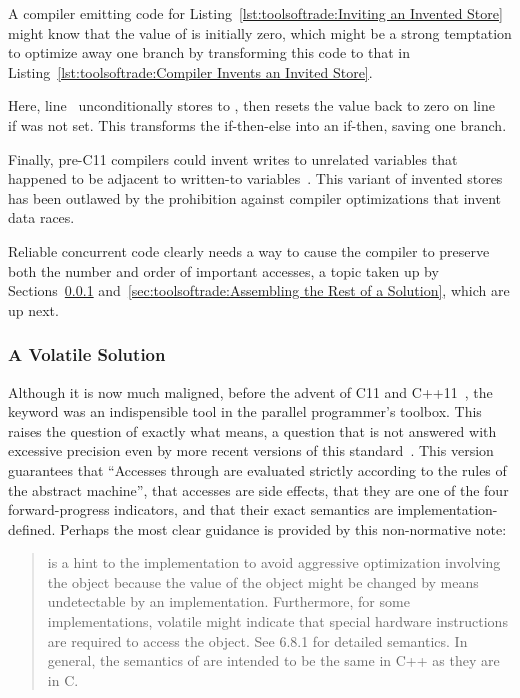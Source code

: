 A compiler emitting code for
Listing~\ref{lst:toolsoftrade:Inviting an Invented Store}
might know that the value of  is initially zero,
which might be a strong temptation to optimize away one branch
by transforming this code to that in
Listing~\ref{lst:toolsoftrade:Compiler Invents an Invited Store}.
\begin{lineref}
Here, line~ unconditionally stores  to , then
resets the value back to zero on
line~ if  was not set.
This transforms the if-then-else into an if-then, saving one branch.
\end{lineref}

Finally, pre-C11 compilers could invent writes to unrelated
variables that happened to be adjacent to written-to
variables~\cite[Section 4.2]{Boehm:2005:TCI:1064978.1065042}.
This variant of invented stores has been outlawed by the prohibition
against compiler optimizations that invent data races.

Reliable concurrent code clearly needs a way to cause the compiler to
preserve both the number and order of important accesses, a topic taken
up by
Sections~\ref{sec:toolsoftrade:A Volatile Solution}
and~\ref{sec:toolsoftrade:Assembling the Rest of a Solution},
which are up next.

\subsubsection{A Volatile Solution}
\label{sec:toolsoftrade:A Volatile Solution}

Although it is now much maligned, before the advent of C11 and
C++11~\cite{PeteBecker2011N3242}, the  keyword was an
indispensible tool in the parallel programmer's toolbox.
This raises the question of exactly what  means,
a question that is not answered with excessive precision even
by more recent versions of this standard~\cite{RichardSmith2018N4762}.
This version guarantees that ``Accesses through 
 are evaluated strictly according to the rules of the
abstract machine'',
that  accesses are side effects,
that they are one of the four forward-progress indicators,
and that their exact semantics are implementation-defined.
Perhaps the most clear guidance is provided by this non-normative note:

\begin{quote}
	 is a hint to the implementation to avoid
	aggressive optimization involving the object because the value
	of the object might be changed by means undetectable by an
	implementation.
	Furthermore, for some implementations, volatile might indicate
	that special hardware instructions are required to access
	the object.
	See 6.8.1 for detailed semantics.
	In general, the semantics of  are intended to be the
	same in C++ as they are in C.
\end{quote}

